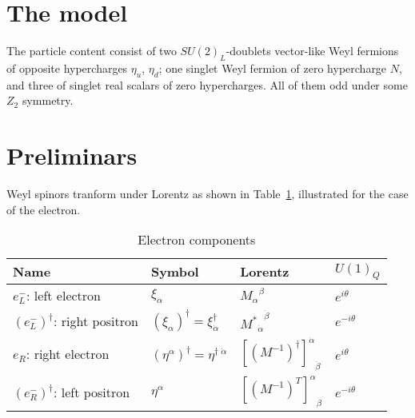 

\section{The model}
 The particle content consist of two $SU(2)_L$-doublets vector-like
 Weyl fermions of opposite hypercharges $\eta_u$, $\eta_d$; one singlet
 Weyl fermion of zero hypercharge $N$, and three of singlet real
 scalars of zero hypercharges. All of them odd under some $Z_2$
 symmetry.

\section{Preliminars}

Weyl spinors tranform under Lorentz as shown in Table~\ref{tab:electron}, illustrated for the case of the electron.

\begin{table}
  \centering
  \begin{tabular}{llll}
    Name & Symbol & Lorentz & $U(1)_Q$\\\hline
   $e_L^-$: left electron & $\xi_{\alpha}$ & ${M_{\alpha}}^{\beta}$ & $e^{i\theta}$\\
   $\left( e_L^- \right)^{\dagger}$: right positron    & $\left( \xi_{\alpha} \right)^{\dagger}=\xi^{\dagger}_{\dot{\alpha}}$ & ${{M^{*}}_{\dot{\alpha}}}^{\dot{\beta}}$ & $e^{-i\theta}$\\
   $e_R$: right electron   & $\left( \eta^{\alpha} \right)^{\dagger}=\eta^{\dagger\;\dot{\alpha}}$ & ${\left[ \left( M^{-1} \right)^\dagger \right]^{\dot{\alpha}}}_{\dot{\beta}}$& $e^{i\theta}$\\
   $\left( e_R^{-} \right)^{\dagger}$: left positron &$\eta^{\alpha}$& ${\left[ \left( M^{-1} \right)^T \right]^{\alpha}}_{\beta}$ & $e^{-i\theta}$\\\hline
  \end{tabular}
  \caption{Electron components}
  \label{tab:electron}
\end{table}



